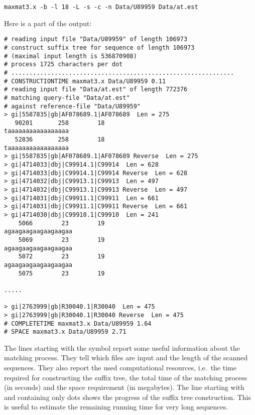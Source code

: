 \documentclass[12pt]{article}
\begin{document}
\begin{verbatim}
maxmat3.x -b -l 18 -L -s -c -n Data/U89959 Data/at.est
\end{verbatim}

Here is a part of the output:

\begin{small}
\begin{verbatim}
# reading input file "Data/U89959" of length 106973
# construct suffix tree for sequence of length 106973
# (maximal input length is 536870908)
# process 1725 characters per dot
# ..............................................................
# CONSTRUCTIONTIME maxmat3.x Data/U89959 0.11
# reading input file "Data/at.est" of length 772376
# matching query-file "Data/at.est"
# against reference-file "Data/U89959"
> gi|5587835|gb|AF078689.1|AF078689  Len = 275
   90201       258        18
taaaaaaaaaaaaaaaaa
   52836       258        18
taaaaaaaaaaaaaaaaa
> gi|5587835|gb|AF078689.1|AF078689 Reverse  Len = 275
> gi|4714033|dbj|C99914.1|C99914  Len = 628
> gi|4714033|dbj|C99914.1|C99914 Reverse  Len = 628
> gi|4714032|dbj|C99913.1|C99913  Len = 497
> gi|4714032|dbj|C99913.1|C99913 Reverse  Len = 497
> gi|4714031|dbj|C99911.1|C99911  Len = 661
> gi|4714031|dbj|C99911.1|C99911 Reverse  Len = 661
> gi|4714030|dbj|C99910.1|C99910  Len = 241
    5066        23        19
agaagaagaagaagaagaa
    5069        23        19
agaagaagaagaagaagaa
    5072        23        19
agaagaagaagaagaagaa
    5075        23        19

.....

> gi|2763999|gb|R30040.1|R30040  Len = 475
> gi|2763999|gb|R30040.1|R30040 Reverse  Len = 475
# COMPLETETIME maxmat3.x Data/U89959 1.64
# SPACE maxmat3.x Data/U89959 2.71
\end{verbatim}
\end{small}

The lines starting with the symbol \texttt{} report some useful
information about the matching process. They tell which files are input
and the length of the scanned sequences. They also report
the used computational resources, i.e.\ the time required for 
constructing the suffix tree, the total time of the matching process 
(in seconds) and the space requirement (in megabytes). 
The line starting with
\texttt{} and containing only dots shows the progress of the
suffix tree construction. This is useful to estimate the remaining
running time for very long sequences.
\end{document}
